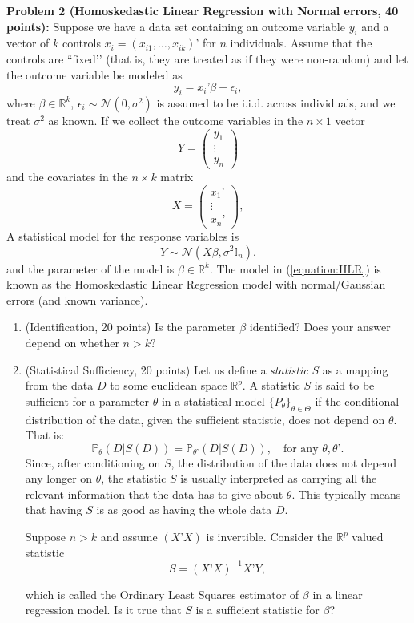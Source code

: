 \documentclass[11pt]{article} %
\begin{document}
\noindent \textbf{Problem 2 (Homoskedastic Linear Regression with Normal errors, 40 points):} Suppose we have a data set containing an outcome variable $y_i$ and a vector of $k$ controls $x_i = (x_{i1},\ldots, x_{ik})’$ for $n$ individuals. Assume that the controls are ``fixed’’ (that is, they are treated as if they were non-random) and let the outcome variable be modeled as
\[ y_i = x_i’ \beta + \epsilon_{i}, \]
where $\beta \in \mathbb{R}^{k}$, $\epsilon_{i} \sim \mathcal{N}(0, \sigma^2)$ is assumed to be i.i.d. across individuals, and we treat $\sigma^2$ as known.  If we collect the outcome variables in the $n \times 1$ vector
\[ 
Y = 
\begin{pmatrix}
y_{1} \\
\vdots \\
y_{n}
\end{pmatrix} 
\]
and the covariates in the $n \times k$ matrix
\[ X =
\begin{pmatrix}
x_1’ \\
\vdots\\
x_n’
\end{pmatrix},
\]
A statistical model for the response variables is
\begin{equation} \label{equation:HLR}
Y \sim \mathcal{N}(X \beta, \sigma^2 \mathbb{I}_n ). 
\end{equation}
and the parameter of the model is $\beta \in \mathbb{R}^{k}$. The model in (\ref{equation:HLR}) is known as the Homoskedastic Linear Regression model with normal/Gaussian errors (and known variance). 

\begin{enumerate}
\item (Identification, 20 points) Is the parameter $\beta$ identified? Does your answer depend on whether $n > k$?  

\item (Statistical Sufficiency, 20 points) Let us define a \emph{statistic} $S$ as a mapping from the data $D$ to some euclidean space $\mathbb{R}^{p}$. A statistic $S$ is said to be sufficient for a parameter $\theta$  in a statistical model $\{P_{\theta}\}_{\theta \in \Theta}$ if the conditional distribution of the data, given the sufficient statistic, does not depend on $\theta$. That is:
\[ \mathbb{P}_{\theta} (D | S(D)) = \mathbb{P}_{\theta’}(D| S(D)), \quad \textrm{for any } \theta, \theta’. \]
Since, after conditioning on $S$, the distribution of the data does not depend any longer on $\theta$, the statistic $S$ is usually interpreted as carrying all the relevant information that the data has to give about $\theta$. This typically means that having $S$ is as good as having the whole data $D$. 

Suppose $n > k$ and assume $(X’X)$ is invertible. Consider the $\mathbb{R}^{p}$ valued statistic 
\[ S = (X’X)^{-1} X’ Y, \]

which is called the Ordinary Least Squares estimator of $\beta$ in a linear regression model. Is it true that $S$ is a sufficient statistic for $\beta$?

\end{enumerate}
\end{document}
